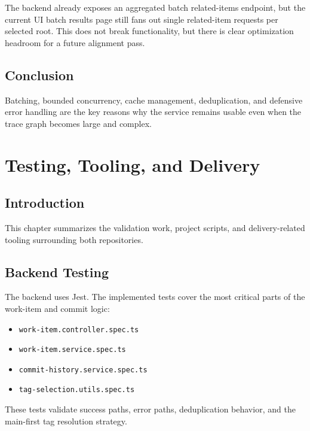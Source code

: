 \documentclass[12pt,a4paper]{report}
\newcommand{\code}[1]{\texttt{\small\color{codered}#1}}
\begin{document}
\begin{infobox}
The backend already exposes an aggregated batch related-items endpoint, but the
current UI batch results page still fans out single related-item requests per
selected root. This does not break functionality, but there is clear optimization
headroom for a future alignment pass.
\end{infobox}

\section{Conclusion}

Batching, bounded concurrency, cache management, deduplication, and defensive
error handling are the key reasons why the service remains usable even when the
trace graph becomes large and complex.

\chapter{Testing, Tooling, and Delivery}

\section{Introduction}

This chapter summarizes the validation work, project scripts, and
delivery-related tooling surrounding both repositories.

\section{Backend Testing}

The backend uses Jest. The implemented tests cover the most critical parts of
the work-item and commit logic:

\begin{itemize}
  \item \code{work-item.controller.spec.ts}
  \item \code{work-item.service.spec.ts}
  \item \code{commit-history.service.spec.ts}
  \item \code{tag-selection.utils.spec.ts}
\end{itemize}

\noindent These tests validate success paths, error paths, deduplication behavior,
and the main-first tag resolution strategy.
\end{document}
